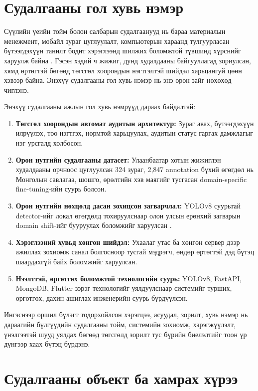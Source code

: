 \section{Судалгааны гол хувь нэмэр}

Сүүлийн үеийн тойм болон салбарын судалгаанууд нь бараа материалын менежмент, мобайл зураг цуглуулалт, компьютерын хараанд тулгуурласан бүтээгдэхүүн танилт бодит хэрэглээнд шилжих боломжтой түвшинд хүрснийг харуулж байна \cite{inventory_management_ai,mobile_retail,retail_cv_survey}. Гэсэн хэдий ч жижиг, дунд худалдааны байгууллагад зориулсан, хямд өртөгтэй бөгөөд төгсгөл хоорондын нэгтгэлтэй шийдэл харьцангуй цөөн хэвээр байна. Энэхүү судалгааны гол хувь нэмэр нь энэ орон зайг нөхөхөд чиглэнэ.

Энэхүү судалгааны ажлын гол хувь нэмрүүд дараах байдалтай:

\begin{enumerate}
\item \textbf{Төгсгөл хоорондын автомат аудитын архитектур:} Зураг авах, бүтээгдэхүүн илрүүлэх, тоо нэгтгэх, нормтой харьцуулах, аудитын статус гаргах дамжлагыг нэг урсгалд холбосон.
\item \textbf{Орон нутгийн судалгааны датасет:} Улаанбаатар хотын жижиглэн худалдааны орчноос цуглуулсан 324 зураг, 2{,}847 annotation бүхий өгөгдөл нь Монголын савлагаа, шошго, өрөлтийн хэв маягийг тусгасан domain-specific fine-tuning-ийн суурь болсон.
\item \textbf{Орон нутгийн нөхцөлд дасан зохицсон загварчлал:} YOLOv8 суурьтай detector-ийг локал өгөгдөлд тохируулснаар олон улсын ерөнхий загварын domain shift-ийг бууруулах боломжийг харуулсан \cite{transfer_learning,retail_cv_survey}.
\item \textbf{Хэрэглээний хувьд хөнгөн шийдэл:} Ухаалаг утас ба хөнгөн сервер дээр ажиллах зохиомж санал болгосноор тусгай мэдрэгч, өндөр өртөгтэй дэд бүтэц шаардахгүй байх боломжийг харуулсан.
\item \textbf{Нээлттэй, өргөтгөх боломжтой технологийн суурь:} YOLOv8, FastAPI, MongoDB, Flutter зэрэг технологийг уялдуулснаар системийг турших, өргөтгөх, дахин ашиглах инженерийн суурь бүрдүүлсэн.
\end{enumerate}

Ингэснээр оршил бүлэгт тодорхойлсон хэрэгцээ, асуудал, зорилт, хувь нэмэр нь дараагийн бүлгүүдийн судалгааны тойм, системийн зохиомж, хэрэгжүүлэлт, үнэлгээтэй шууд уялдах бөгөөд төгсгөлд зорилт тус бүрийн биелэлтийг тоон үр дүнгээр хаах бүтэц бүрдэнэ.

\section{Судалгааны объект ба хамрах хүрээ}

